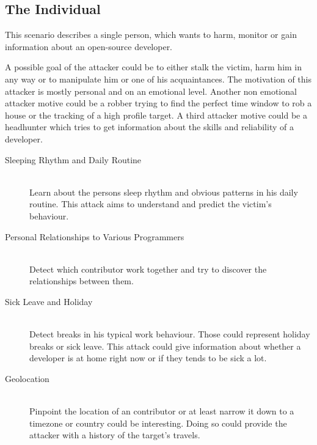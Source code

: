 \subsection{The Individual}
This scenario describes a single person, which wants to harm, monitor or gain information about an open-source developer.

A possible goal of the attacker could be to either stalk the victim, harm him in any way or to manipulate him or one of his acquaintances.
The motivation of this attacker is mostly personal and on an emotional level.
Another non emotional attacker motive could be a robber trying to find the perfect time window to rob a house or the tracking of a high profile target.
A third attacker motive could be a headhunter which tries to get information about the skills and reliability of a developer.

\begin{description}
    \item[Sleeping Rhythm and Daily Routine] \hfill \\
        Learn about the persons sleep rhythm and obvious patterns in his daily routine.
        This attack aims to understand and predict the victim's behaviour.

    \item[Personal Relationships to Various Programmers] \hfill \\
        Detect which contributor work together and try to discover the relationships between them.

    \item[Sick Leave and Holiday] \hfill \\
        Detect breaks in his typical work behaviour. Those could represent holiday breaks or sick leave.
        This attack could give information about whether a developer is at home right now or if they tends to be sick a lot.

    \item[Geolocation] \hfill \\
        Pinpoint the location of an contributor or at least narrow it down to a timezone or country could be interesting.
        Doing so could provide the attacker with a history of the target's travels.
\end{description}




